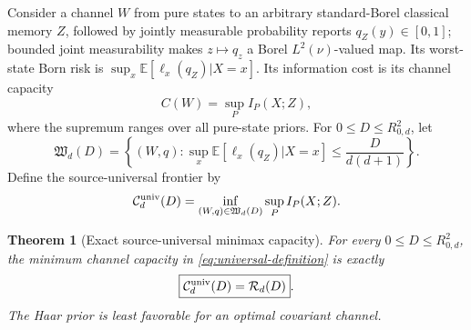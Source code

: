 \documentclass[11pt,a4paper]{article}
\newtheorem{theorem}{Theorem}[section]
\theoremstyle{remark}
\newcommand{\E}{\mathbb{E}}
\newcommand{\cR}{\mathcal{R}}
\newcommand{\cC}{\mathcal{C}}
\begin{document}
Consider a channel $W$ from pure states to an arbitrary standard-Borel
classical memory $Z$, followed by jointly measurable probability reports
$q_Z(y)\in[0,1]$; bounded joint measurability makes
$z\mapsto q_z$ a Borel $L^2(\nu)$-valued map.  Its worst-state
Born risk is $\sup_x\E[\ell_x(q_Z)|X=x]$.  Its information cost is its channel
capacity
\begin{equation}
 C(W)=\sup_P I_P(X;Z),
 \label{eq:channel-capacity}
\end{equation}
where the supremum ranges over all pure-state priors.
For $0\le D\le R_{0,d}^2$, let
\begin{equation}
 \mathfrak W_d(D)=\left\{(W,q):
 \sup_x\E[\ell_x(q_Z)|X=x]\le\frac{D}{d(d+1)}\right\}.
 \label{eq:uniform-risk-class}
\end{equation}
Define the source-universal frontier by
\begin{equation}
 \cC_d^{\rm univ}(D)=
 \inf_{(W,q)\in\mathfrak W_d(D)}\sup_P I_P(X;Z).
 \label{eq:universal-definition}
\end{equation}

\begin{theorem}[Exact source-universal minimax capacity]
\label{thm:minimax}
For every $0\le D\le R_{0,d}^2$, the minimum channel capacity in
\eqref{eq:universal-definition} is exactly
\begin{equation}
 \boxed{\cC_d^{\rm univ}(D)=\cR_d(D)}.
 \label{eq:minimax-equality}
\end{equation}
The Haar prior is least favorable for an optimal covariant channel.
\end{theorem}
\end{document}
